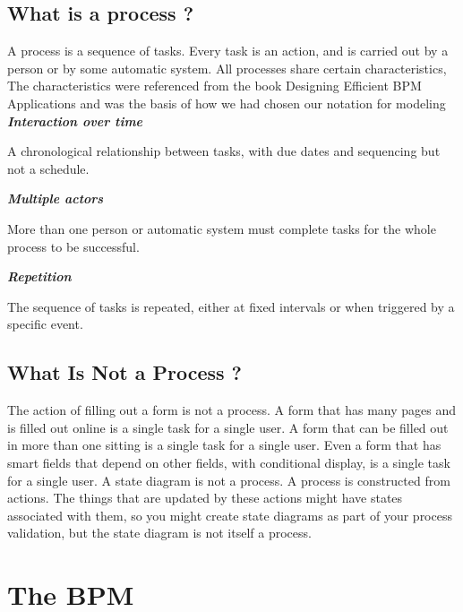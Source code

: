 \section{What is a process ?}
A process is a sequence of tasks. Every task is an action, and is carried out by a person
or by some automatic system. All processes share certain characteristics, The characteristics were referenced from the book 
Designing Efficient BPM Applications \cite{bpmapp} and was the basis of how we had chosen our notation for modeling\\

\textbf{\textit{Interaction over time}}
\begin{adjustwidth}{2cm}{}
    A chronological relationship between tasks, with due dates and sequencing but
not a schedule.\\
\end{adjustwidth}
\textbf{\textit{Multiple actors}}
\begin{adjustwidth}{2cm}{}
    More than one person or automatic system must complete tasks for the whole
process to be successful.\\
\end{adjustwidth}
\textbf{\textit{Repetition}}
\begin{adjustwidth}{2cm}{}
    The sequence of tasks is repeated, either at fixed intervals or when triggered by a
specific event.
\end{adjustwidth}

\section{What Is Not a Process ?}
The action of filling out a form is not a process. A form that has many pages and is
filled out online is a single task for a single user. A form that can be filled out in more
than one sitting is a single task for a single user. Even a form that has smart fields that
depend on other fields, with conditional display, is a single task for a single user.
A state diagram is not a process. A process is constructed from actions. The things
that are updated by these actions might have states associated with them, so you
might create state diagrams as part of your process validation, but the state diagram is
not itself a process.

\chapter{The BPM}

